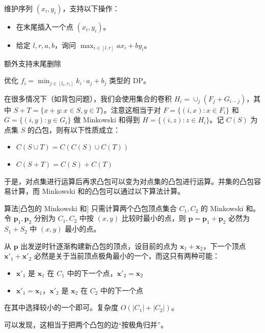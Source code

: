 \begin{example}[{P3309 [SDOI2014] 向量集}]
    维护序列 $(x_i,y_i)$，支持以下操作：
    \begin{itemize}
        \item 在末尾插入一个点 $(x_i,y_i)$。
        \item 给定 $l,r,a,b$，询问 $\max_{i\in [l,r]}ax_i+by_i$。
    \end{itemize}
\end{example}
\begin{exercise}
    额外支持末尾删除
\end{exercise}
\begin{exercise}
    优化 $f_i=\min_{j\in [l_i,r_i]}k_i\cdot a_j+b_j$ 类型的 DP。
\end{exercise}

在很多情况下（如背包问题），我们会使用集合的卷积 $H_i=\cup_j (F_j+G_{i-j})$，其中 $S+T=\{x+y:x\in S,y\in T\}$。注意这相当于对 $F=\{(i,x):x\in F_i\}$ 和 $G=\{(i,y):y\in G_i\}$ 做 Minkowski 和得到 $H=\{(i,z):z\in H_i\}$。记 $C(S)$ 为点集 $S$ 的凸包，则有以下性质成立：
\begin{property}
    \begin{itemize}
        \item $C(S\cup T)=C(C(S)\cup C(T))$
        \item $C(S+T)=C(S)+C(T)$
    \end{itemize}
\end{property}

于是，对点集进行运算后再求凸包可以变为对点集的凸包进行运算。并集的凸包容易计算，而 Minkowski 和的凸包可以通过以下算法计算。
\begin{descbox}{算法}[凸包的 Minkowski 和]
    只需计算两个凸包顶点集合 $C_1,C_2$ 的 Minkowski 和。令 $\mathbf p_1,\mathbf p_2$ 分别为 $C_1,C_2$ 中按 $(x,y)$ 比较时最小的点，则 $\mathbf p=\mathbf p_1+\mathbf p_2$ 必然为 $S_1+S_2$ 中 $(x,y)$ 最小的点。

    从 $\mathbf p$ 出发逆时针逐渐构建新凸包的顶点，设目前的点为 $\mathbf x_1+\mathbf x_2$，下一个顶点 $\mathbf x'_1+\mathbf x'_2$ 必然是关于当前顶点极角最小的一个，而这只有两种可能：
    \begin{itemize}
        \item $\mathbf x'_1$ 是 $\mathbf x_1$ 在 $C_1$ 中的下一个点，$\mathbf x'_2=\mathbf x_2$
        \item $\mathbf x'_1=\mathbf x_1$，$\mathbf x'_2$ 是 $\mathbf x_2$ 在 $C_2$ 中的下一个点
    \end{itemize}
    在其中选择较小的一个即可。复杂度 $O(|C_1|+|C_2|)$。
\end{descbox}
\begin{remark}
    可以发现，这相当于把两个凸包的边“按极角归并”。
\end{remark}


